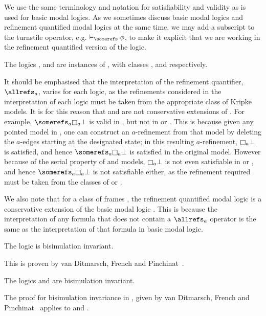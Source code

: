 We use the same terminology and notation for satisfiability and validity as is
used for basic modal logics. As we sometimes discuss basic modal logics and
refinement quantified modal logics at the same time, we may add a subscript to
the turnstile operator, e.g. $\entails_\somerefs \phi$, to make it
explicit that we are working in the refinement quantified version of the logic.

The logics \logicKF{}, \logicKDF{} and \logicSF{} are instances of \logicCF{},
with classes \classK{}, \classKD{} and \classS{} respectively. 

It should be emphasised that the interpretation of the refinement quantifier,
$\allrefs_a$, varies for each logic, as the refinements considered in the
interpretation of each logic must be taken from the appropriate class of Kripke
models. It is for this reason that \logicSF{} and \logicKDF{} are not
conservative extensions of \logicKF{}. For example, $\somerefs_a \knows_a \bot$
is valid in \logicKF{}, but not in \logicSF{} or \logicKDF{}. This is because
given any pointed model in \classK{}, one can construct an $a$-refinement from
that model by deleting the $a$-edges starting at the designated state; in this
resulting $a$-refinement, $\knows_a \bot$ is satisfied, and hence $\somerefs_a
\knows_a \bot$ is satisfied in the original model. However because of the serial
property of \classS{} and \classKD{} models, $\knows_a \bot$ is not even
satisfiable in \logicSF{} or \logicKDF{}, and hence $\somerefs_a \knows_a \bot$
is not satisfiable either, as the refinement required must be taken from the
classes of \classS{} or \classKD{}.

We also note that for a class of frames \classC{}, the refinement quantified
modal logic \logicCF{} is a conservative extension of the basic modal logic
\logicC{}. This is because the interpretation of any formula that does not
contain a $\allrefs_a$ operator is the same as the interpretation of that
formula in basic modal logic.

\begin{lemma}
The logic \logicKF{} is bisimulation invariant.
\end{lemma}

This is proven by van Ditmarsch, French and Pinchinat~\cite{french2010future}.

\begin{lemma}
The logics \logicKDF{} and \logicSF{} are bisimulation invariant.
\end{lemma}

The proof for bisimulation invariance in \logicKF{}, given by van Ditmarsch,
French and Pinchinat~\cite{french2010future} applies to \logicSF{} and
\logicKDF{}.

